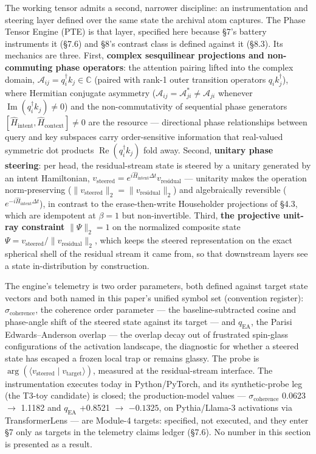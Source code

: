 \documentclass[11pt]{article}
\begin{document}
The working tensor admits a second, narrower discipline: an instrumentation and steering layer defined over the same state the archival atom captures. The Phase Tensor Engine (PTE) is that layer, specified here because \S{}7's battery instruments it (\S{}7.6) and \S{}8's contrast class is defined against it (\S{}8.3). Its mechanics are three. First, \textbf{complex sesquilinear projections and non-commuting phase operators}: the attention pairing lifted into the complex domain, \(\mathcal{A}_{ij} = q_i^\dagger k_j \in \mathbb{C}\) (paired with rank-1 outer transition operators \(q_i k_j^{\dagger}\)), where Hermitian conjugate asymmetry (\(\mathcal{A}_{ij} = \mathcal{A}_{ji}^{*} \neq \mathcal{A}_{ji}\) whenever \(\operatorname{Im}(q_i^\dagger k_j) \neq 0\)) and the non-commutativity of sequential phase generators \([\hat{H}_{\text{intent}}, \hat{H}_{\text{context}}] \neq 0\) are the resource --- directional phase relationships between query and key subspaces carry order-sensitive information that real-valued symmetric dot products \(\operatorname{Re}(q_i^\dagger k_j)\) fold away. Second, \textbf{unitary phase steering}: per head, the residual-stream state is steered by a unitary generated by an intent Hamiltonian, \(v_{\text{steered}} = e^{i\hat{H}_{\text{intent}}\Delta t} v_{\text{residual}}\) --- unitarity makes the operation norm-preserving (\(\lVert v_{\text{steered}}\rVert_2 = \lVert v_{\text{residual}}\rVert_2\)) and algebraically reversible (\(e^{-i\hat{H}_{\text{intent}}\Delta t}\)), in contrast to the erase-then-write Householder projections of \S{}4.3, which are idempotent at \(\beta = 1\) but non-invertible. Third, \textbf{the projective unit-ray constraint} \(\lVert\Psi\rVert_2 = 1\) on the normalized composite state \(\Psi = v_{\text{steered}} / \lVert v_{\text{residual}}\rVert_2\), which keeps the steered representation on the exact spherical shell of the residual stream it came from, so that downstream layers see a state in-distribution by construction.

The engine's telemetry is two order parameters, both defined against target state vectors and both named in this paper's unified symbol set (convention register): \(\sigma_{\text{coherence}}\), the coherence order parameter --- the baseline-subtracted cosine and phase-angle shift of the steered state against its target --- and \(q_{\text{EA}}\), the Parisi Edwards--Anderson overlap --- the overlap decay out of frustrated spin-glass configurations of the activation landscape, the diagnostic for whether a steered state has escaped a frozen local trap or remains glassy. The probe is \(\arg(\langle v_{\text{steered}} \mid v_{\text{target}}\rangle)\), measured at the residual-stream interface. The instrumentation executes today in Python/PyTorch, and its synthetic-probe leg (the T3-toy candidate) is closed; the production-model values --- \(\sigma_{\text{coherence}}\) 0.0623 \(\to\) 1.1182 and \(q_{\text{EA}}\) +0.8521 \(\to\) \(-0.1325\), on Pythia/Llama-3 activations via TransformerLens --- are Module-4 targets: specified, not executed, and they enter \S{}7 only as targets in the telemetry claims ledger (\S{}7.6). No number in this section is presented as a result.
\end{document}
